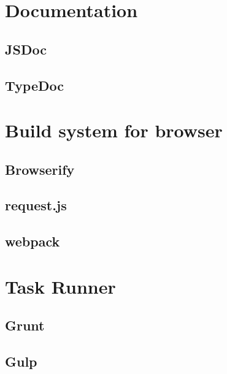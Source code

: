 \section{Documentation}
	\label{sect:documentation}
	
	\subsection{JSDoc}
	\label{ssect:jsdoc}
	
	\subsection{TypeDoc}
	\label{ssect:typedoc}
	

\section{Build system for browser}
	\label{sect:build_browser}
	
	\subsection{Browserify}
	\label{ssect:browserify}
	
	\subsection{request.js}
	\label{ssect:request_js}
	
	\subsection{webpack}
	\label{ssect:webpack}


\section{Task Runner}
\label{sect:build_system}

	\subsection{Grunt}
	\label{ssect:grunt}
	
	\subsection{Gulp}
	\label{ssect:gulp}
	
